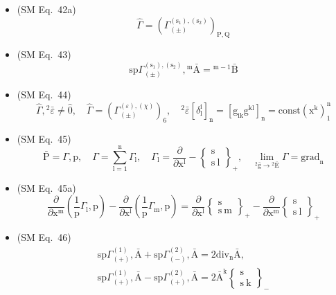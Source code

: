 \documentclass[
    12pt,              %
    a4paper,           %
    headings=normal,   %
    twoside=true,      %
    BCOR=8mm,          %
]{scrbook}
\begin{document}
\begin{itemize}[label={},leftmargin=0pt]
    \item (SM Eq.\ 42a) 
    \[
    \widehat{\Gamma} = \left( \Gamma^{(\mathrm{s}_1), (\mathrm{s}_2)}_{(\pm)} \right)_{\mathrm{P,Q}}
    \]

    \item (SM Eq.\ 43) 
    \[
    \mathrm{sp} \Gamma^{(\mathrm{s}_1), (\mathrm{s}_2)}_{(\pm)}, {}^\mathrm{m}\bar{\mathrm{A}} = {}^{\mathrm{m}-1}\bar{\mathrm{B}}
    \]

    \item (SM Eq.\ 44) 
    \[
    \widehat{\Gamma}, {}^2\bar{\varepsilon} \ne \hat{0}, \quad \widehat{\Gamma} = \left( \Gamma^{(\varepsilon), (\chi)}_{(\pm)} \right)_6, \quad {}^2\bar{\varepsilon} \left[ \delta_\mathrm{l}^\mathrm{i} \right]_\mathrm{n} = \left[ \mathrm{g}_{\mathrm{ik}}\mathrm{g}^{\mathrm{kl}} \right]_\mathrm{n} = \mathrm{const} \left( \mathrm{x^k} \right)_1^\mathrm{n}
    \]

    \item (SM Eq.\ 45) 
    \[
    \bar{\mathrm{P}} = \Gamma, \mathrm{p}, \quad \Gamma = \sum_{\mathrm{l}=1}^\mathrm{n} \Gamma_\mathrm{l}, \quad \Gamma_\mathrm{l} = \frac{\partial}{\partial \mathrm{x^l}} - \left\{ \begin{smallmatrix} \mathrm{s} \\ \mathrm{s\ l} \end{smallmatrix} \right\}_+, \quad \lim_{{}^2\bar{\mathrm{g}} \to {}^2\bar{\mathrm{E}}} \Gamma = \mathrm{grad}_\mathrm{n}
    \]

    \item (SM Eq.\ 45a) 
    \[
    \frac{\partial}{\partial \mathrm{x^m}} \left( \frac{1}{\mathrm{p}} \Gamma_\mathrm{l}, \mathrm{p} \right) - \frac{\partial}{\partial \mathrm{x^l}} \left( \frac{1}{\mathrm{p}} \Gamma_\mathrm{m}, \mathrm{p} \right) = \frac{\partial}{\partial \mathrm{x^l}} \left\{ \begin{smallmatrix} \mathrm{s} \\ \mathrm{s\ m} \end{smallmatrix} \right\}_+ - \frac{\partial}{\partial \mathrm{x^m}} \left\{ \begin{smallmatrix} \mathrm{s} \\ \mathrm{s\ l} \end{smallmatrix} \right\}_+
    \]

    \item (SM Eq.\ 46) 
    \[
    \begin{gathered}
    \mathrm{sp} \Gamma^{(1)}_{(+)}, \bar{\mathrm{A}} + \mathrm{sp} \Gamma^{(2)}_{(-)}, \bar{\mathrm{A}} = 2 \mathrm{div}_\mathrm{n} \bar{\mathrm{A}}, \\
    \mathrm{sp} \Gamma^{(1)}_{(+)}, \bar{\mathrm{A}} - \mathrm{sp} \Gamma^{(2)}_{(+)}, \bar{\mathrm{A}} = 2 \bar{\mathrm{A}}^\mathrm{k} \left\{ \begin{smallmatrix} \mathrm{s} \\ \mathrm{s\ k} \end{smallmatrix} \right\}_-
    \end{gathered}
    \]


\end{itemize}
\end{document}
